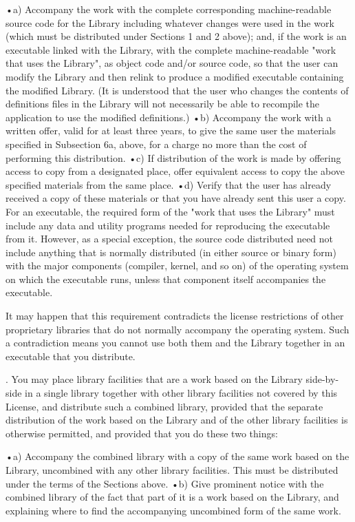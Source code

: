 •a) Accompany the work with the complete corresponding machine-readable source code for the Library including whatever changes were used in the work (which must be distributed under Sections 1 and 2 above); and, if the work is an executable linked with the Library, with the complete machine-readable "work that uses the Library", as object code and/or source code, so that the user can modify the Library and then relink to produce a modified executable containing the modified Library. (It is understood that the user who changes the contents of definitions files in the Library will not necessarily be able to recompile the application to use the modified definitions.) 
•b) Accompany the work with a written offer, valid for at least three years, to give the same user the materials specified in Subsection 6a, above, for a charge no more than the cost of performing this distribution. 
•c) If distribution of the work is made by offering access to copy from a designated place, offer equivalent access to copy the above specified materials from the same place. 
•d) Verify that the user has already received a copy of these materials or that you have already sent this user a copy. 
For an executable, the required form of the "work that uses the Library" must include any data and utility programs needed for reproducing the executable from it. However, as a special exception, the source code distributed need not include anything that is normally distributed (in either source or binary form) with the major components (compiler, kernel, and so on) of the operating system on which the executable runs, unless that component itself accompanies the executable. 

It may happen that this requirement contradicts the license restrictions of other proprietary libraries that do not normally accompany the operating system. Such a contradiction means you cannot use both them and the Library together in an executable that you distribute. 

. You may place library facilities that are a work based on the Library side-by-side in a single library together with other library facilities not covered by this License, and distribute such a combined library, provided that the separate distribution of the work based on the Library and of the other library facilities is otherwise permitted, and provided that you do these two things: 

•a) Accompany the combined library with a copy of the same work based on the Library, uncombined with any other library facilities. This must be distributed under the terms of the Sections above. 
•b) Give prominent notice with the combined library of the fact that part of it is a work based on the Library, and explaining where to find the accompanying uncombined form of the same work. 

